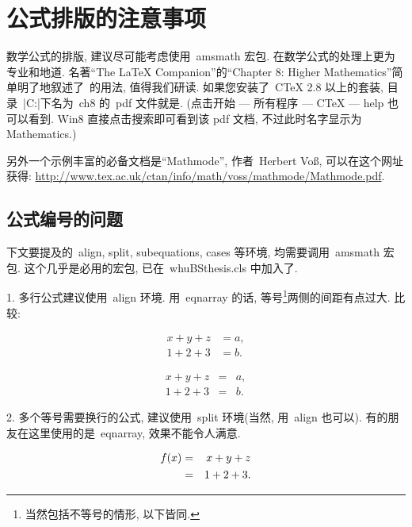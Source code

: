 \documentclass{whuBSthesis}%
\begin{document}
\chapter{公式排版的注意事项}

数学公式的排版, 建议尽可能考虑使用~amsmath 宏包.
\AMSLaTeX 在数学公式的处理上更为专业和地道.
名著``The \LaTeX{} Companion''的``Chapter 8: Higher Mathematics''简单明了地叙述了~\AMSLaTeX 的用法, 值得我们研读.
如果您安装了~CTeX 2.8 以上的套装, 目录~\everb|C:\CTEX\CTeX\ctex\doc|下名为~ch8 的~pdf 文件就是.
(点击开始 --- 所有程序 --- CTeX --- help 也可以看到. Win8 直接点击搜索即可看到该 pdf 文档, 不过此时名字显示为 Mathematics.)


另外一个示例丰富的必备文档是``Mathmode'', 作者~Herbert Vo\ss, 可以在这个网址获得:
\url{http://www.tex.ac.uk/ctan/info/math/voss/mathmode/Mathmode.pdf}.


\section{公式编号的问题}

下文要提及的~align, split, subequations, cases 等环境, 均需要调用~amsmath 宏包.
这个几乎是必用的宏包, 已在~whuBSthesis.cls 中加入了.

1. 多行公式建议使用~align 环境. 用~eqnarray 的话, 等号\footnote{当然包括不等号的情形, 以下皆同.}两侧的间距有点过大.
比较:

\begin{SideBySideExample}[xrightmargin=8cm,frame=single ]
  \begin{align}
   x+y+z&=a,\\
   1+2+3&=b.
  \end{align}
\end{SideBySideExample}

\begin{SideBySideExample}[xrightmargin=8cm,frame=single ]
  \begin{eqnarray}
   x+y+z&=&a,\\
   1+2+3&=&b.
  \end{eqnarray}
\end{SideBySideExample}


2. 多个等号需要换行的公式, 建议使用~split 环境({\kaishu 当然, 用~align 也可以}).
有的朋友在这里使用的是~eqnarray, 效果不能令人满意.

\begin{SideBySideExample}[xrightmargin=8cm,frame=single ]
  \begin{eqnarray}
    f(x) &=& x+y+z \notag\\
         &=& 1+2+3.
  \end{eqnarray}
\end{SideBySideExample}
\end{document}
